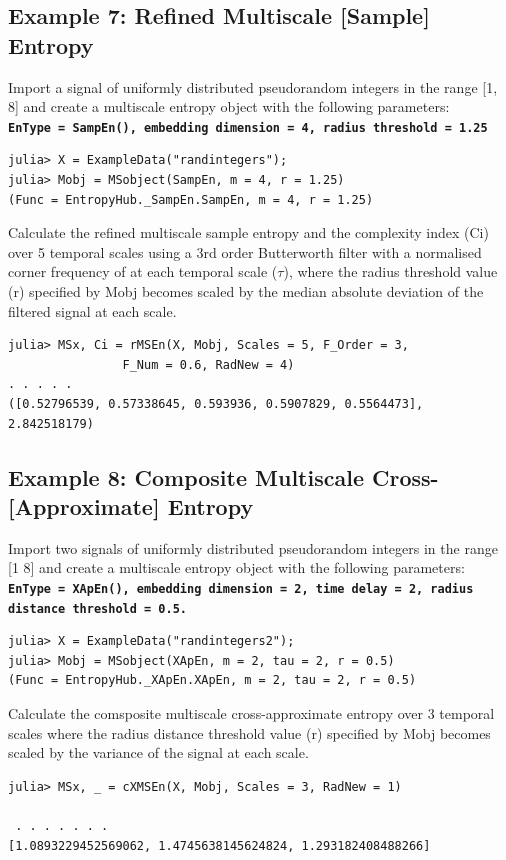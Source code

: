 \documentclass[12pt, a4paper, titlepage, openany]{book}
\begin{document}
\newpage
\subsection{\normalsize Example 7: \hspace{15mm} Refined Multiscale [Sample] Entropy}
\noindent Import a signal of uniformly distributed pseudorandom integers in the range [1, 8] and create a multiscale entropy object with the following parameters:\\
\textbf{\texttt{EnType =  SampEn(), embedding dimension = 4, radius threshold = 1.25}}
\begin{verbatim}
julia> X = ExampleData("randintegers");
julia> Mobj = MSobject(SampEn, m = 4, r = 1.25)
(Func = EntropyHub._SampEn.SampEn, m = 4, r = 1.25)
\end{verbatim}      
Calculate the refined multiscale sample entropy and the complexity index (Ci) over 5 temporal scales using a 3rd order Butterworth filter with a normalised corner frequency of  at each temporal scale ($\tau$), where the radius threshold value (r) specified by Mobj becomes scaled by the median absolute deviation of the filtered signal at each scale.
\begin{verbatim}
julia> MSx, Ci = rMSEn(X, Mobj, Scales = 5, F_Order = 3, 
                F_Num = 0.6, RadNew = 4)
. . . . . 
([0.52796539, 0.57338645, 0.593936, 0.5907829, 0.5564473], 
2.842518179)
\end{verbatim}


\newpage
\subsection{\normalsize Example 8: \hspace{15mm}Composite Multiscale Cross-[Approximate] Entropy}
\noindent Import two signals of uniformly distributed pseudorandom integers in the range [1 8] and create a multiscale entropy object with the following parameters:\\
\texttt{\textbf{EnType =  XApEn(), embedding dimension = 2, time delay = 2, radius distance threshold = 0.5.}}
\begin{verbatim}
julia> X = ExampleData("randintegers2");
julia> Mobj = MSobject(XApEn, m = 2, tau = 2, r = 0.5)
(Func = EntropyHub._XApEn.XApEn, m = 2, tau = 2, r = 0.5)
\end{verbatim}
Calculate the comsposite multiscale cross-approximate entropy over 3 temporal scales where the radius distance threshold value (r) specified by Mobj becomes scaled by the variance of the signal at each scale.
\begin{verbatim}
julia> MSx, _ = cXMSEn(X, Mobj, Scales = 3, RadNew = 1)

 . . . . . . .
[1.0893229452569062, 1.4745638145624824, 1.293182408488266]
\end{verbatim}
\end{document}
